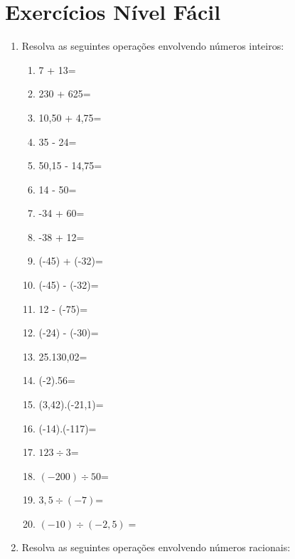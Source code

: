 \section{Exercícios Nível Fácil}
 \begin{enumerate}
 \item Resolva as seguintes operações envolvendo números inteiros:
 
\begin{multicols}{2}
 \begin{enumerate}
 \item 7 + 13=
 \item 230 + 625=
 \item 10,50 + 4,75=
 \item 35 - 24=
 \item 50,15 - 14,75=
 \item 14 - 50=
 \item -34 + 60=
 \item -38 + 12=
 \item (-45) + (-32)=
 \item (-45) - (-32)=
 \item 12 - (-75)=
 \item (-24) - (-30)=
 \item 25.130,02=
 \item (-2).56=
 \item (3,42).(-21,1)=
 \item (-14).(-117)=
 \item $123 \div 3$=
 \item $(-200) \div 50$=
 \item $3,5 \div (-7)$=
 \item $(-10) \div (-2,5)=$
\end{enumerate}
\end{multicols}

 \item Resolva as seguintes operações envolvendo números racionais:
 

\end{enumerate}
